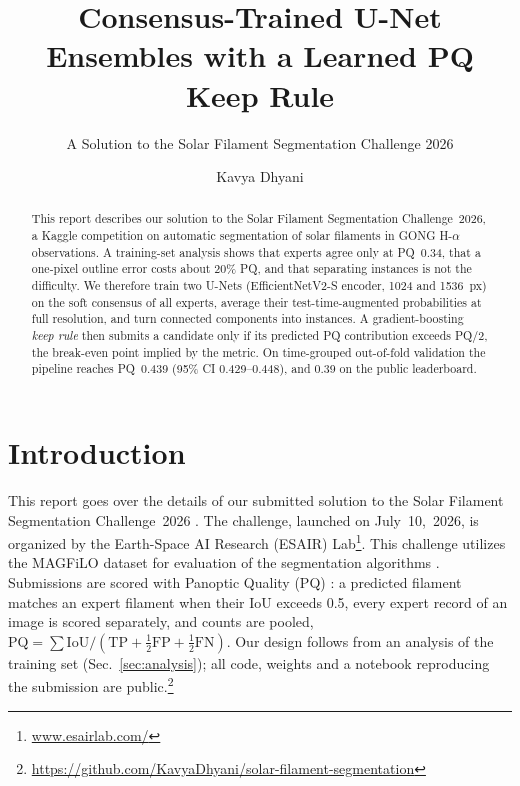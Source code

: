 \documentclass[sigconf]{acmart}
\begin{document}
\setlength{\emergencystretch}{1.5em}

\title{Consensus-Trained U-Net Ensembles with a Learned PQ Keep Rule}
\subtitle{A Solution to the Solar Filament Segmentation Challenge 2026} %

\author{Kavya Dhyani}

\begin{abstract}
    This report describes our solution to the Solar Filament Segmentation Challenge~2026, a Kaggle competition on automatic segmentation of solar filaments in GONG H-$\alpha$ observations. A training-set analysis shows that experts agree only at PQ~0.34, that a one-pixel outline error costs about 20\% PQ, and that separating instances is not the difficulty. We therefore train two U-Nets (EfficientNetV2-S encoder, 1024 and 1536~px) on the soft consensus of all experts, average their test-time-augmented probabilities at full resolution, and turn connected components into instances. A gradient-boosting \emph{keep rule} then submits a candidate only if its predicted PQ contribution exceeds PQ/2, the break-even point implied by the metric. On time-grouped out-of-fold validation the pipeline reaches PQ~0.439 (95\% CI 0.429--0.448), and 0.39 on the public leaderboard.
\end{abstract}

\maketitle

\section{Introduction}
    This report goes over the details of our submitted solution to the Solar Filament Segmentation Challenge~2026 \cite{filament-segmentation-2026}. The challenge, launched on July~10,~2026, is organized by the Earth-Space AI Research (ESAIR) Lab\footnote{\href{https://www.esairlab.com/home}{www.esairlab.com/}}. This challenge utilizes the MAGFiLO dataset for evaluation of the segmentation algorithms \cite{ahmadzadeh2024dataset}. Submissions are scored with Panoptic Quality (PQ) \cite{kirillov2019panoptic}: a predicted filament matches an expert filament when their IoU exceeds 0.5, every expert record of an image is scored separately, and counts are pooled, $\mathrm{PQ}=\sum \mathrm{IoU}/(\mathrm{TP}+\tfrac12\mathrm{FP}+\tfrac12\mathrm{FN})$. Our design follows from an analysis of the training set (Sec.~\ref{sec:analysis}); all code, weights and a notebook reproducing the submission are public.\footnote{\url{https://github.com/KavyaDhyani/solar-filament-segmentation}}
\end{document}
